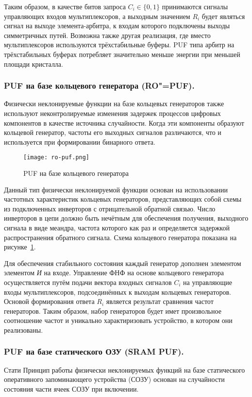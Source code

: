 Таким образом, в качестве битов запроса $C_i \in \{0,1\} $ принимаются сигналы управляющих входов мультиплексоров, а выходным значением $R_i$ будет являться сигнал на выходе элемента-арбитра, к входам которого подключены выходы симметричных путей. Возможна также другая реализация, где вместо мультиплексоров используются трёхстабильные буферы. PUF типа арбитр на трёхстабильных буферах потребляет значительно меньше энергии при меньшей площади кристалла.

\subsubsection{PUF на базе кольцевого генератора (RO"=PUF). }
\label{sub:domain:puf_types:ring_oscillator}

Физически неклонируемые функции на базе кольцевых генераторов также используют неконтролируемые изменения задержек процессов цифровых компонентов в качестве источника случайности. Когда эти компоненты образуют кольцевой генератор, частоты его выходных сигналов различаются, что и используется при формировании бинарного ответа.

\begin{figure}[ht]
    \centering
    \texttt{[image: ro-puf.png]}
    \caption{PUF на базе кольцевого генератора}
    \label{fig:domain:puf_types:ring_oscillator}
\end{figure}

Данный тип физически неклонируемой функции основан на использовании частотных характеристик кольцевых генераторов, представляющих собой схемы из подключенных инверторов с отрицательной обратной связью. Число инверторов в цепи должно быть нечётным для обеспечения получения, выходного сигнала в виде меандра, частота которого как раз и определяется задержкой распространения обратного сигнала. Схема кольцевого генератора показана на рисунке~\ref{fig:domain:puf_types:ring_oscillator}.

Для обеспечения стабильного состояния каждый генератор дополнен элементом элементом \emph{И} на входе. Управление ФНФ на основе кольцевого генератора осуществляется путём подачи вектора входных сигналов $C_i$ на управляющие входы мультиплексоров, подсоединённых к выходам кольцевых генераторов. Основой формирования ответа $R_i$ является результат сравнения частот генераторов. Таким образом, набор генераторов будет имет произвольное соотношение частот и уникально характиризовать устройство, в котором они реализованы.

\subsubsection{PUF на базе статического ОЗУ (SRAM PUF). }
\label{sub:domain:puf_types:sram}
Стати
Принцип работы физически неклонируемых функций на базе статического оперативного запоминающего устройства (СОЗУ) основан на случайности состояния части ячеек СОЗУ при включении.

